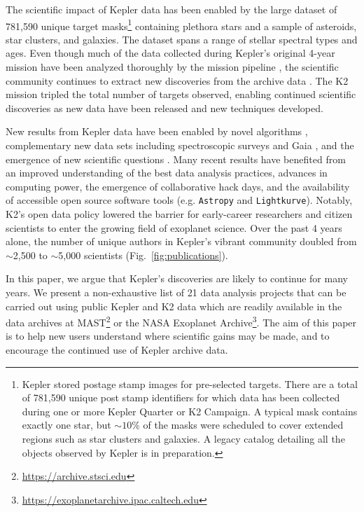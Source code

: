 \documentclass[modern]{aastex62}
\begin{document}
The scientific impact of Kepler data has been enabled by the large dataset of 781,590 unique target masks\footnote{Kepler stored postage stamp images for pre-selected targets. There are a total of 781,590 unique post stamp identifiers for which data has been collected during one or more Kepler Quarter or K2 Campaign. A typical mask contains exactly one star, but $\sim10\%$ of the masks were scheduled to cover extended regions such as star clusters and galaxies. A legacy catalog detailing all the objects observed by Kepler is in preparation.} containing plethora stars and a sample of asteroids, star clusters, and galaxies. The dataset spans a range of stellar spectral types and ages. Even though much of the data collected during Kepler's original 4-year mission have been analyzed thoroughly by the mission pipeline \citep[e.g.][]{jenkins2010,twicken2016,thompson2018}, the scientific community continues to extract new discoveries from the archive data \citep[e.g.][]{shallue2018}. The K2 mission tripled the total number of targets observed, enabling continued scientific discoveries as new data have been released and new techniques developed.

New results from Kepler data have been enabled by novel algorithms \cite[e.g.][]{foreman-mackey2017,hedges2018,hon2018}, complementary new data sets including spectroscopic surveys and Gaia \citep[e.g][]{wittenmyer2018,zong2018,berger2018}, and the emergence of new scientific questions \citep[e.g.][]{teachey2018}.  Many recent results have benefited from an improved understanding of the best data analysis practices, advances in computing power, the emergence of collaborative hack days, and the availability of accessible open source software tools (e.g. \texttt{Astropy} and \texttt{Lightkurve}). Notably, K2's open data policy lowered the barrier for early-career researchers and citizen scientists to enter the growing field of exoplanet science. Over the past 4 years alone, the number of unique authors in Kepler's vibrant community doubled from $\sim$2,500 to $\sim$5,000 scientists (Fig.~\ref{fig:publications}).

In this paper, we argue that Kepler's discoveries are likely to continue for many years.  We present a non-exhaustive list of 21 data analysis projects that can be carried out using public Kepler and K2 data which are readily available in the data archives at MAST\footnote{\url{https://archive.stsci.edu}} or the NASA Exoplanet Archive\footnote{\url{https://exoplanetarchive.ipac.caltech.edu}}.  The aim of this paper is to help new users understand where scientific gains may be made, and to encourage the continued use of Kepler archive data.
\end{document}
